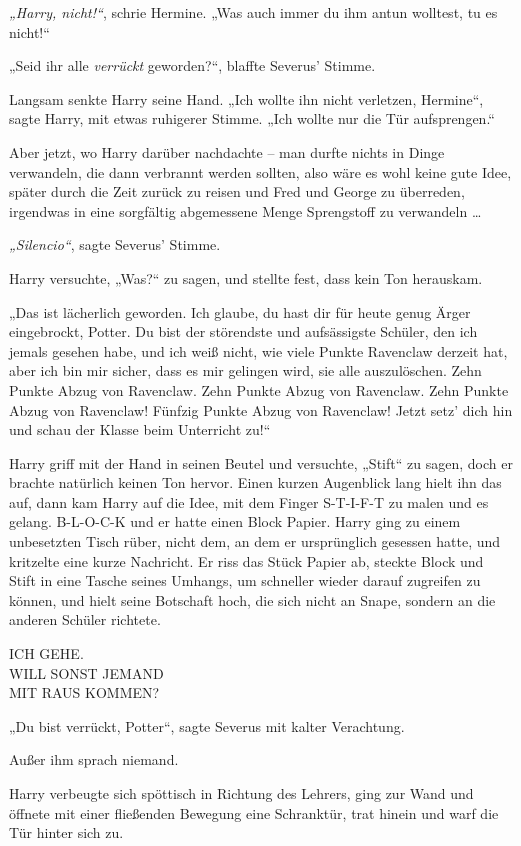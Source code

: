 {\emph{„Harry, nicht!“}, schrie Hermine. „Was auch immer du ihm antun wolltest, tu es nicht!“

„Seid ihr alle \emph{verrückt} geworden?“, blaffte Severus' Stimme.

Langsam senkte Harry seine Hand. „Ich wollte ihn nicht verletzen, Hermine“, sagte Harry, mit etwas ruhigerer Stimme. „Ich wollte nur die Tür aufsprengen.“

Aber jetzt, wo Harry darüber nachdachte -- man durfte nichts in Dinge verwandeln, die dann verbrannt werden sollten, also wäre es wohl keine gute Idee, später durch die Zeit zurück zu reisen und Fred und George zu überreden, irgendwas in eine sorgfältig abgemessene Menge Sprengstoff zu verwandeln …

\emph{„Silencio“}, sagte Severus' Stimme.

Harry versuchte, „Was?“ zu sagen, und stellte fest, dass kein Ton herauskam.

„Das ist lächerlich geworden. Ich glaube, du hast dir für heute genug Ärger eingebrockt, Potter. Du bist der störendste und aufsässigste Schüler, den ich jemals gesehen habe, und ich weiß nicht, wie viele Punkte Ravenclaw derzeit hat, aber ich bin mir sicher, dass es mir gelingen wird, sie alle auszulöschen. Zehn Punkte Abzug von Ravenclaw. Zehn Punkte Abzug von Ravenclaw. Zehn Punkte Abzug von Ravenclaw! Fünfzig Punkte Abzug von Ravenclaw! Jetzt setz' dich hin und schau der Klasse beim Unterricht zu!“

Harry griff mit der Hand in seinen Beutel und versuchte, „Stift“ zu sagen, doch er brachte natürlich keinen Ton hervor. Einen kurzen Augenblick lang hielt ihn das auf, dann kam Harry auf die Idee, mit dem Finger S-T-I-F-T zu malen und es gelang. B-L-O-C-K und er hatte einen Block Papier. Harry ging zu einem unbesetzten Tisch rüber, nicht dem, an dem er ursprünglich gesessen hatte, und kritzelte eine kurze Nachricht. Er riss das Stück Papier ab, steckte Block und Stift in eine Tasche seines Umhangs, um schneller wieder darauf zugreifen zu können, und hielt seine Botschaft hoch, die sich nicht an Snape, sondern an die anderen Schüler richtete.

ICH GEHE.\\ WILL SONST JEMAND\\ MIT RAUS KOMMEN?

„Du bist verrückt, Potter“, sagte Severus mit kalter Verachtung.

Außer ihm sprach niemand.

Harry verbeugte sich spöttisch in Richtung des Lehrers, ging zur Wand und öffnete mit einer fließenden Bewegung eine Schranktür, trat hinein und warf die Tür hinter sich zu.

}
